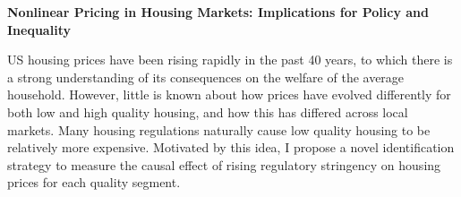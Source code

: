 \documentclass[11pt]{amsart}
\begin{document}
\bigskip
\begin{center}
\LARGE
\textbf{Nonlinear Pricing in Housing Markets: Implications for Policy and Inequality }\\
\large
\normalsize
\end{center}
US housing prices have been rising rapidly in the past 40 years, to which there is a strong understanding of its consequences on the welfare of the average household. However, little is known about how prices have evolved differently for both low and high quality housing, and how this has differed across local markets. Many housing regulations naturally cause low quality housing to be relatively more expensive. Motivated by this idea, I propose a novel identification strategy to measure the causal effect of rising regulatory stringency on housing prices for each quality segment.  \\
\end{document}
